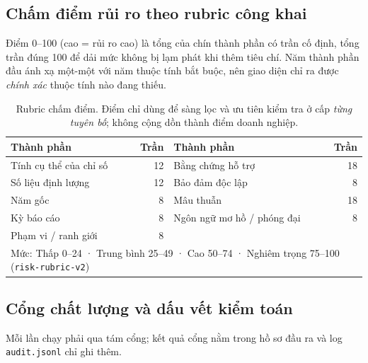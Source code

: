 \documentclass[11pt,a4paper]{article}
\newcommand{\code}[1]{\texttt{#1}}
\begin{document}
\subsection{Chấm điểm rủi ro theo rubric công khai}

Điểm 0--100 (cao = rủi ro cao) là tổng của chín thành phần có trần cố định, tổng trần đúng 100 để dải mức không bị lạm phát khi thêm tiêu chí. Năm thành phần đầu ánh xạ một-một với năm thuộc tính bắt buộc, nên giao diện chỉ ra được \emph{chính xác} thuộc tính nào đang thiếu.

\begin{table}[!htbp]\small
\begin{tabularx}{\linewidth}{X r X r}
\toprule
\textbf{Thành phần} & \textbf{Trần} & \textbf{Thành phần} & \textbf{Trần} \\
\midrule
Tính cụ thể của chỉ số & 12 & Bằng chứng hỗ trợ & 18 \\
Số liệu định lượng & 12 & Bảo đảm độc lập & 8 \\
Năm gốc & 8 & Mâu thuẫn & 18 \\
Kỳ báo cáo & 8 & Ngôn ngữ mơ hồ / phóng đại & 8 \\
Phạm vi / ranh giới & 8 & & \\
\midrule
\multicolumn{4}{l}{Mức: Thấp 0--24 · Trung bình 25--49 · Cao 50--74 · Nghiêm trọng 75--100 (\code{risk-rubric-v2})} \\
\bottomrule
\end{tabularx}
\caption{Rubric chấm điểm. Điểm chỉ dùng để sàng lọc và ưu tiên kiểm tra ở cấp \emph{từng tuyên bố}; không cộng dồn thành điểm doanh nghiệp.}
\end{table}

\subsection{Cổng chất lượng và dấu vết kiểm toán}\label{sec:gates}

Mỗi lần chạy phải qua tám cổng; kết quả cổng nằm trong hồ sơ đầu ra và log \code{audit.jsonl} chỉ ghi thêm.
\end{document}
